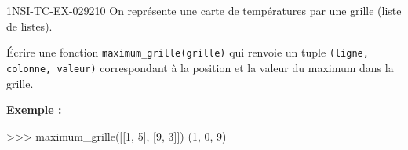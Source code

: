 \begin{exercice}{1NSI-TC-EX-029}{2}{10}
On représente une carte de températures par une grille (liste de listes).

Écrire une fonction \lstinline{maximum_grille(grille)} qui renvoie un tuple
\lstinline{(ligne, colonne, valeur)} correspondant à la position et la valeur du
maximum dans la grille.

\textbf{Exemple :}
\begin{console}
>>> maximum_grille([[1, 5], [9, 3]])
(1, 0, 9)
\end{console}
\end{exercice}
